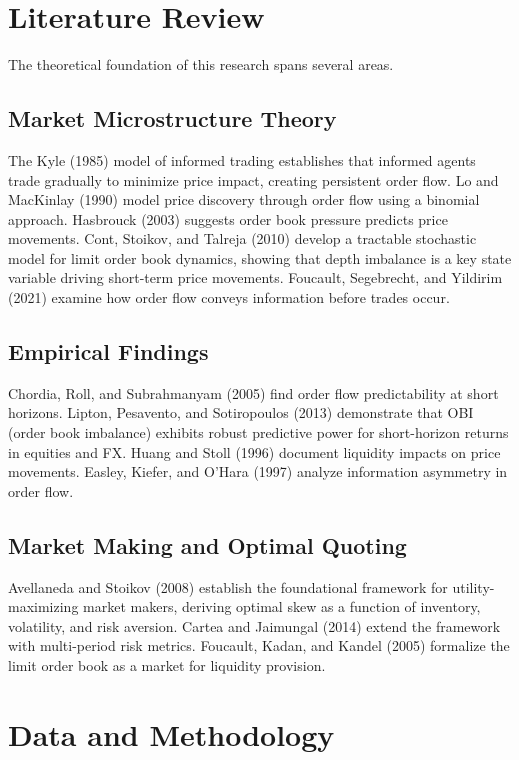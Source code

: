 \documentclass[12pt,a4paper]{article}
\begin{document}
\section{Literature Review}

The theoretical foundation of this research spans several areas.

\subsection{Market Microstructure Theory}

The Kyle (1985) model of informed trading establishes that informed agents trade gradually to minimize price impact, creating persistent order flow. Lo and MacKinlay (1990) model price discovery through order flow using a binomial approach. Hasbrouck (2003) suggests order book pressure predicts price movements. Cont, Stoikov, and Talreja (2010) develop a tractable stochastic model for limit order book dynamics, showing that depth imbalance is a key state variable driving short-term price movements. Foucault, Segebrecht, and Yildirim (2021) examine how order flow conveys information before trades occur.

\subsection{Empirical Findings}

Chordia, Roll, and Subrahmanyam (2005) find order flow predictability at short horizons. Lipton, Pesavento, and Sotiropoulos (2013) demonstrate that OBI (order book imbalance) exhibits robust predictive power for short-horizon returns in equities and FX. Huang and Stoll (1996) document liquidity impacts on price movements. Easley, Kiefer, and O'Hara (1997) analyze information asymmetry in order flow.

\subsection{Market Making and Optimal Quoting}

Avellaneda and Stoikov (2008) establish the foundational framework for utility-maximizing market makers, deriving optimal skew as a function of inventory, volatility, and risk aversion. Cartea and Jaimungal (2014) extend the framework with multi-period risk metrics. Foucault, Kadan, and Kandel (2005) formalize the limit order book as a market for liquidity provision.

\section{Data and Methodology}
\end{document}
